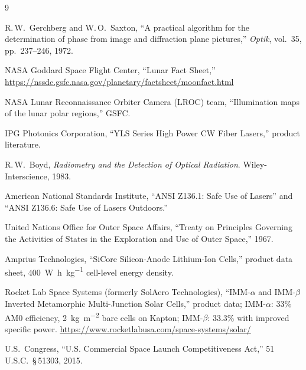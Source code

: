 \documentclass[10pt,letterpaper]{article}
\begin{document}
\begin{thebibliography}{9}

  R.\,W.\ Gerchberg and W.\,O.\ Saxton,
  ``A practical algorithm for the determination of phase from image and
  diffraction plane pictures,''
  \textit{Optik}, vol.~35, pp.~237--246, 1972.

  NASA Goddard Space Flight Center,
  ``Lunar Fact Sheet,''
  \url{https://nssdc.gsfc.nasa.gov/planetary/factsheet/moonfact.html}

  NASA Lunar Reconnaissance Orbiter Camera (LROC) team,
  ``Illumination maps of the lunar polar regions,'' GSFC.

  IPG Photonics Corporation,
  ``YLS Series High Power CW Fiber Lasers,'' product literature.

  R.\,W.\ Boyd,
  \textit{Radiometry and the Detection of Optical Radiation}.
  Wiley-Interscience, 1983.

  American National Standards Institute,
  ``ANSI Z136.1: Safe Use of Lasers'' and
  ``ANSI Z136.6: Safe Use of Lasers Outdoors.''

  United Nations Office for Outer Space Affairs,
  ``Treaty on Principles Governing the Activities of States in the Exploration
  and Use of Outer Space,'' 1967.

  Amprius Technologies,
  ``SiCore Silicon-Anode Lithium-Ion Cells,'' product data sheet,
  \SI{400}{\watt\hour\per\kilo\gram} cell-level energy density.

  Rocket Lab Space Systems (formerly SolAero Technologies),
  ``IMM-$\alpha$ and IMM-$\beta$ Inverted Metamorphic Multi-Junction Solar
  Cells,'' product data; IMM-$\alpha$: 33\% AM0 efficiency,
  \SI{2}{\kilo\gram\per\meter\squared} bare cells on Kapton; IMM-$\beta$:
  33.3\% with improved specific power.
  \url{https://www.rocketlabusa.com/space-systems/solar/}

  U.S.\ Congress,
  ``U.S. Commercial Space Launch Competitiveness Act,''
  51\,U.S.C.\ \S\,51303, 2015.

\end{thebibliography}
\end{document}
